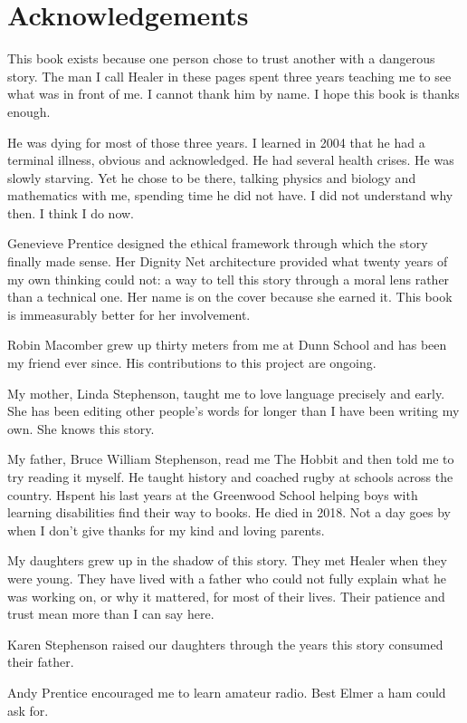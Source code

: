 \chapter*{Acknowledgements}

This book exists because one person chose to trust another with a dangerous story. The man I call Healer in these pages spent three years teaching me to see what was in front of me. I cannot thank him by name. I hope this book is thanks enough.

He was dying for most of those three years. I learned in 2004 that he had a terminal illness, obvious and acknowledged. He had several health crises. He was slowly starving. Yet he chose to be there, talking physics and biology and mathematics with me, spending time he did not have. I did not understand why then. I think I do now.

Genevieve Prentice designed the ethical framework through which the story finally made sense. Her Dignity Net architecture provided what twenty years of my own thinking could not: a way to tell this story through a moral lens rather than a technical one. Her name is on the cover because she earned it. This book is immeasurably better for her involvement.

Robin Macomber grew up thirty meters from me at Dunn School and has been my friend ever since. His contributions to this project are ongoing.

My mother, Linda Stephenson, taught me to love language precisely and early. She has been editing other people's words for longer than I have been writing my own. She knows this story.

My father, Bruce William Stephenson, read me The Hobbit and then told me to try reading it myself. He taught history and coached rugby at schools across the country. Hspent his last years at the Greenwood School helping boys with learning disabilities find their way to books. He died in 2018. Not a day goes by when I don't give thanks for my kind and loving parents.

My daughters grew up in the shadow of this story. They met Healer when they were young. They have lived with a father who could not fully explain what he was working on, or why it mattered, for most of their lives. Their patience and trust mean more than I can say here.

Karen Stephenson raised our daughters through the years this story consumed their father.

Andy Prentice encouraged me to learn amateur radio. Best Elmer a ham could ask for.

